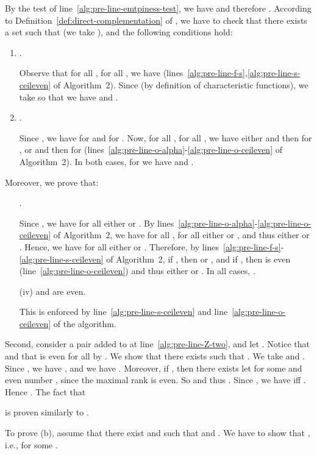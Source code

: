 \documentclass{LMCS}
\begin{document}
By the test of line~\ref{alg:pre-line-emtpiness-test}, we have 
and therefore . 
According to Definition~\ref{def:direct-complementation} of , 
we have to check that there exists a set  such that 
 (we take ), 
and the following conditions hold:
\begin{enumerate}[]
\item .

		Observe that for all , for all , 
		we have  (lines~\ref{alg:pre-line-f-s},\ref{alg:pre-line-s-ceileven} 
		of Algorithm~2). 
		Since  (by definition of characteristic functions), 
		we take  so that we have  and . 
		
\item .

		Since , we have  for 
		and  for .
		Now, for all , for all , 
		we have either  and then  for , 
		or  and then  for 
		(lines~\ref{alg:pre-line-o-alpha}-\ref{alg:pre-line-o-ceileven} 
		of Algorithm~2).
		In both cases, for  we have  and .
\end{enumerate}
Moreover, we prove that:
\begin{enumerate}[]
\item[] .

Since , we have for all  either 
 or .
By lines~\ref{alg:pre-line-o-alpha}-\ref{alg:pre-line-o-ceileven} of Algorithm~2,
we have for all , for all  
either  or ,
and thus either  or . 
Hence, we have for all  either  or 
.
Therefore, by lines~\ref{alg:pre-line-f-s}-\ref{alg:pre-line-s-ceileven} of 
Algorithm~2, if , then  or ,
and if , then  is even (line~\ref{alg:pre-line-o-ceileven})
and thus either  or .
In all cases, .

\item[(iv)]  and  are even. 

This is enforced by line~\ref{alg:pre-line-s-ceileven} and line~\ref{alg:pre-line-o-ceileven} of the algorithm.
\end{enumerate}


\noindent Second, consider a pair  added to
 at line~\ref{alg:pre-line-Z-two}, and let
.  Notice
that  and that  is even for all  by .  We show that there exists  such that .  We take  and .  Since , we have  , and we have 
.  Moreover, if , then there exists let  for some  and even number , since the maximal rank  is even. So  and thus .  Since , we have   iff .  Hence . The fact that

is proven similarly to .

To prove (b), assume that there exist  and 
such that  and 
.
We have to show that , i.e., 
 for some .
\end{document}

